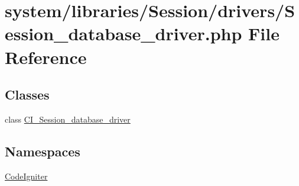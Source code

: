 \hypertarget{_session__database__driver_8php}{}\section{system/libraries/\+Session/drivers/\+Session\+\_\+database\+\_\+driver.php File Reference}
\label{_session__database__driver_8php}
\subsection*{Classes}
\begin{DoxyCompactItemize}
\item 
class \mbox{\hyperlink{class_c_i___session__database__driver}{C\+I\+\_\+\+Session\+\_\+database\+\_\+driver}}
\end{DoxyCompactItemize}
\subsection*{Namespaces}
\begin{DoxyCompactItemize}
\item 
 \mbox{\hyperlink{namespace_code_igniter}{Code\+Igniter}}
\end{DoxyCompactItemize}
